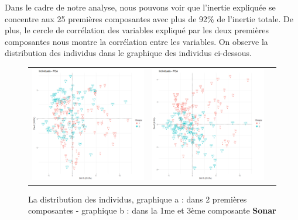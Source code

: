 \documentclass[a4paper,11pt,oneside,roman]{article}
\begin{document}
Dans le cadre de notre analyse, nous pouvons voir que l'inertie expliquée se concentre aux 25 premières composantes avec plus de 92\% de l'inertie totale. De plus, le cercle de corrélation des variables expliqué par les deux premières composantes nous montre la corrélation entre les variables. On observe la distribution des individus dans le graphique des individus ci-dessous. 
\begin{figure}[htb]
    \centering
    \begin{tabular}{ccc}
    \includegraphics[scale = .3]{./discrimination/Sonar/indi_plot12.png} &
    \includegraphics[scale = .3]{./discrimination/Sonar/indi_plot13.png} 
    \end{tabular}
    \caption{La distribution des individus, graphique a : dans 2 premières composantes - graphique b : dans la 1me et 3ème composante \textbf{Sonar}}
    \label{fig:my_label}
\end{figure}
\end{document}
